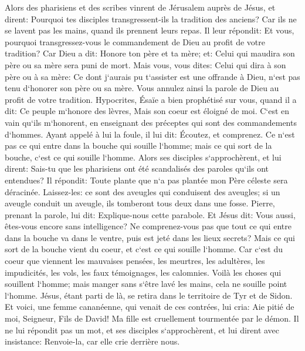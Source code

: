 \verse Alors des pharisiens et des scribes vinrent de Jérusalem auprès de Jésus, et dirent: 
\verse Pourquoi tes disciples transgressent-ils la tradition des anciens? Car ils ne se lavent pas les mains, quand ils prennent leurs repas. 
\verse Il leur répondit: Et vous, pourquoi transgressez-vous le commandement de Dieu au profit de votre tradition? 
\verse Car Dieu a dit: Honore ton père et ta mère; et: Celui qui maudira son père ou sa mère sera puni de mort. 
\verse Mais vous, vous dites: Celui qui dira à son père ou à sa mère: Ce dont j`aurais pu t`assister est une offrande à Dieu, n`est pas tenu d`honorer son père ou sa mère. 
\verse Vous annulez ainsi la parole de Dieu au profit de votre tradition. 
\verse Hypocrites, Ésaïe a bien prophétisé sur vous, quand il a dit: 
\verse Ce peuple m`honore des lèvres, Mais son coeur est éloigné de moi. 
\verse C`est en vain qu`ils m`honorent, en enseignant des préceptes qui sont des commandements d`hommes. 
\verse Ayant appelé à lui la foule, il lui dit: Écoutez, et comprenez. 
\verse Ce n`est pas ce qui entre dans la bouche qui souille l`homme; mais ce qui sort de la bouche, c`est ce qui souille l`homme. 
\verse Alors ses disciples s`approchèrent, et lui dirent: Sais-tu que les pharisiens ont été scandalisés des paroles qu`ils ont entendues? 
\verse Il répondit: Toute plante que n`a pas plantée mon Père céleste sera déracinée. 
\verse Laissez-les: ce sont des aveugles qui conduisent des aveugles; si un aveugle conduit un aveugle, ils tomberont tous deux dans une fosse. 
\verse Pierre, prenant la parole, lui dit: Explique-nous cette parabole. 
\verse Et Jésus dit: Vous aussi, êtes-vous encore sans intelligence? 
\verse Ne comprenez-vous pas que tout ce qui entre dans la bouche va dans le ventre, puis est jeté dans les lieux secrets? 
\verse Mais ce qui sort de la bouche vient du coeur, et c`est ce qui souille l`homme. 
\verse Car c`est du coeur que viennent les mauvaises pensées, les meurtres, les adultères, les impudicités, les vols, les faux témoignages, les calomnies. 
\verse Voilà les choses qui souillent l`homme; mais manger sans s`être lavé les mains, cela ne souille point l`homme. 
\verse Jésus, étant parti de là, se retira dans le territoire de Tyr et de Sidon. 
\verse Et voici, une femme cananéenne, qui venait de ces contrées, lui cria: Aie pitié de moi, Seigneur, Fils de David! Ma fille est cruellement tourmentée par le démon. 
\verse Il ne lui répondit pas un mot, et ses disciples s`approchèrent, et lui dirent avec insistance: Renvoie-la, car elle crie derrière nous. 
